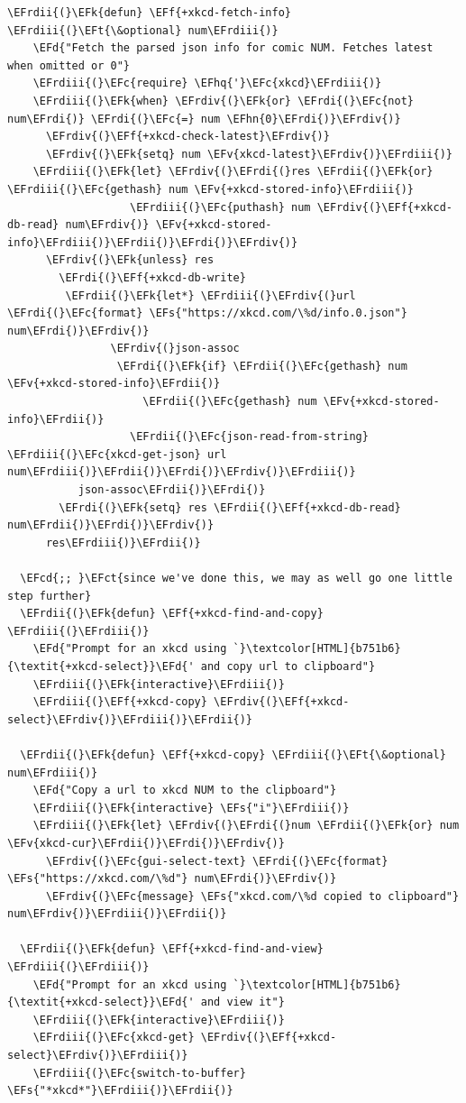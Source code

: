 \documentclass{scrartcl}
\newcommand{\EFk}[1]{\textcolor{EFk}{#1}} %
\newcommand{\EFd}[1]{\textcolor{EFd}{\textit{#1}}} %
\newcommand{\EFt}[1]{\textcolor{EFt}{#1}} %
\newcommand{\EFs}[1]{\textcolor{EFs}{#1}} %
\newcommand{\EFct}[1]{\textcolor{EFct}{#1}} %
\newcommand{\EFc}[1]{\textcolor{EFc}{#1}} %
\newcommand{\EFv}[1]{\textcolor{EFv}{#1}} %
\newcommand{\EFf}[1]{\textcolor{EFf}{#1}} %
\newcommand{\EFcd}[1]{\textcolor{EFcd}{#1}} %
\newcommand{\EFhn}[1]{\textcolor{EFhn}{\textbf{#1}}} %
\newcommand{\EFhq}[1]{\textcolor{EFhq}{#1}} %
\newcommand{\EFrdi}[1]{\textcolor{EFrdi}{#1}} %
\newcommand{\EFrdii}[1]{\textcolor{EFrdii}{#1}} %
\newcommand{\EFrdiii}[1]{\textcolor{EFrdiii}{#1}} %
\newcommand{\EFrdiv}[1]{\textcolor{EFrdiv}{#1}} %
\begin{document}
\begin{Code}
\begin{Verbatim}[]
  \EFrdii{(}\EFk{defun} \EFf{+xkcd-fetch-info} \EFrdiii{(}\EFt{\&optional} num\EFrdiii{)}
    \EFd{"Fetch the parsed json info for comic NUM. Fetches latest when omitted or 0"}
    \EFrdiii{(}\EFc{require} \EFhq{'}\EFc{xkcd}\EFrdiii{)}
    \EFrdiii{(}\EFk{when} \EFrdiv{(}\EFk{or} \EFrdi{(}\EFc{not} num\EFrdi{)} \EFrdi{(}\EFc{=} num \EFhn{0}\EFrdi{)}\EFrdiv{)}
      \EFrdiv{(}\EFf{+xkcd-check-latest}\EFrdiv{)}
      \EFrdiv{(}\EFk{setq} num \EFv{xkcd-latest}\EFrdiv{)}\EFrdiii{)}
    \EFrdiii{(}\EFk{let} \EFrdiv{(}\EFrdi{(}res \EFrdii{(}\EFk{or} \EFrdiii{(}\EFc{gethash} num \EFv{+xkcd-stored-info}\EFrdiii{)}
                   \EFrdiii{(}\EFc{puthash} num \EFrdiv{(}\EFf{+xkcd-db-read} num\EFrdiv{)} \EFv{+xkcd-stored-info}\EFrdiii{)}\EFrdii{)}\EFrdi{)}\EFrdiv{)}
      \EFrdiv{(}\EFk{unless} res
        \EFrdi{(}\EFf{+xkcd-db-write}
         \EFrdii{(}\EFk{let*} \EFrdiii{(}\EFrdiv{(}url \EFrdi{(}\EFc{format} \EFs{"https://xkcd.com/\%d/info.0.json"} num\EFrdi{)}\EFrdiv{)}
                \EFrdiv{(}json-assoc
                 \EFrdi{(}\EFk{if} \EFrdii{(}\EFc{gethash} num \EFv{+xkcd-stored-info}\EFrdii{)}
                     \EFrdii{(}\EFc{gethash} num \EFv{+xkcd-stored-info}\EFrdii{)}
                   \EFrdii{(}\EFc{json-read-from-string} \EFrdiii{(}\EFc{xkcd-get-json} url num\EFrdiii{)}\EFrdii{)}\EFrdi{)}\EFrdiv{)}\EFrdiii{)}
           json-assoc\EFrdii{)}\EFrdi{)}
        \EFrdi{(}\EFk{setq} res \EFrdii{(}\EFf{+xkcd-db-read} num\EFrdii{)}\EFrdi{)}\EFrdiv{)}
      res\EFrdiii{)}\EFrdii{)}

  \EFcd{;; }\EFct{since we've done this, we may as well go one little step further}
  \EFrdii{(}\EFk{defun} \EFf{+xkcd-find-and-copy} \EFrdiii{(}\EFrdiii{)}
    \EFd{"Prompt for an xkcd using `}\textcolor[HTML]{b751b6}{\textit{+xkcd-select}}\EFd{' and copy url to clipboard"}
    \EFrdiii{(}\EFk{interactive}\EFrdiii{)}
    \EFrdiii{(}\EFf{+xkcd-copy} \EFrdiv{(}\EFf{+xkcd-select}\EFrdiv{)}\EFrdiii{)}\EFrdii{)}

  \EFrdii{(}\EFk{defun} \EFf{+xkcd-copy} \EFrdiii{(}\EFt{\&optional} num\EFrdiii{)}
    \EFd{"Copy a url to xkcd NUM to the clipboard"}
    \EFrdiii{(}\EFk{interactive} \EFs{"i"}\EFrdiii{)}
    \EFrdiii{(}\EFk{let} \EFrdiv{(}\EFrdi{(}num \EFrdii{(}\EFk{or} num \EFv{xkcd-cur}\EFrdii{)}\EFrdi{)}\EFrdiv{)}
      \EFrdiv{(}\EFc{gui-select-text} \EFrdi{(}\EFc{format} \EFs{"https://xkcd.com/\%d"} num\EFrdi{)}\EFrdiv{)}
      \EFrdiv{(}\EFc{message} \EFs{"xkcd.com/\%d copied to clipboard"} num\EFrdiv{)}\EFrdiii{)}\EFrdii{)}

  \EFrdii{(}\EFk{defun} \EFf{+xkcd-find-and-view} \EFrdiii{(}\EFrdiii{)}
    \EFd{"Prompt for an xkcd using `}\textcolor[HTML]{b751b6}{\textit{+xkcd-select}}\EFd{' and view it"}
    \EFrdiii{(}\EFk{interactive}\EFrdiii{)}
    \EFrdiii{(}\EFc{xkcd-get} \EFrdiv{(}\EFf{+xkcd-select}\EFrdiv{)}\EFrdiii{)}
    \EFrdiii{(}\EFc{switch-to-buffer} \EFs{"*xkcd*"}\EFrdiii{)}\EFrdii{)}


\end{Verbatim}
\end{Code}
\end{document}
